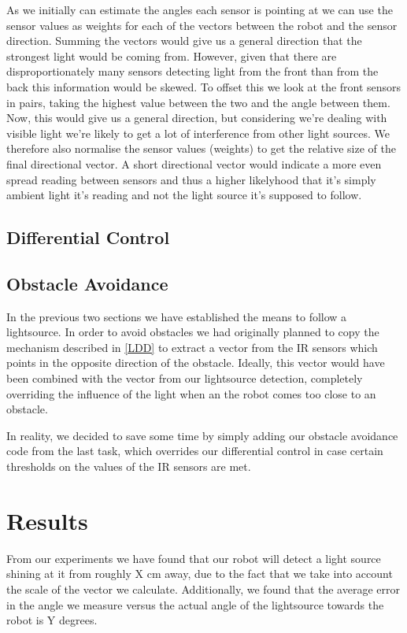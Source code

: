 \documentclass[paper=a4, fontsize=12pt]{scrartcl}	%
\numberwithin{equation}{section}		%
\numberwithin{figure}{section}			%
\numberwithin{table}{section}				%
\begin{document}
As we initially can estimate the angles each sensor is pointing at we can use the sensor values as weights for each of the vectors between the robot and the sensor direction. Summing the vectors would give us a general direction that the strongest light would be coming from. However, given that there are disproportionately many sensors detecting light from the front than from the back this information would be skewed. To offset this we look at the front sensors in pairs, taking the highest value between the two and the angle between them. Now, this would give us a general direction, but considering we're dealing with visible light we're likely to get a lot of interference from other light sources. We therefore also normalise the sensor values (weights) to get the relative size of the final directional vector. A short directional vector would indicate a more even spread reading between sensors and thus a higher likelyhood that it's simply ambient light it's reading and not the light source it's supposed to follow.
\subsection{Differential Control}


\subsection{Obstacle Avoidance}
In the previous two sections we have established the means to follow a lightsource. In order to avoid obstacles we had originally planned to copy the mechanism described in \ref{LDD} to extract a vector from the IR sensors which points in the opposite direction of the obstacle. Ideally, this vector would have been combined with the vector from our lightsource detection, completely overriding the influence of the light when an the robot comes too close to an obstacle.

In reality, we decided to save some time by simply adding our obstacle avoidance code from the last task, which overrides our differential control in case certain thresholds on the values of the IR sensors are met.
\section{Results}
From our experiments we have found that our robot will detect a light source shining at it from roughly X cm away, due to the fact that we take into account the scale of the vector we calculate. Additionally, we found that the average error in the angle we measure versus the actual angle of the lightsource towards the robot is Y degrees.
\end{document}
